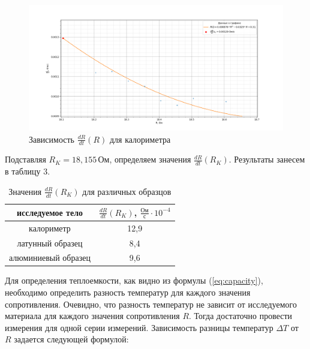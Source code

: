 \documentclass[a4paper, 12pt]{article}%
\begin{document}
\begin{figure}[H]
\begin{center}
\begin{minipage}[h]{0.48\linewidth}
				
			\end{minipage}
			
		\end{center}
		\begin{center}
			\begin{minipage}[h]{0.98\linewidth}
				\includegraphics[width=1\linewidth]{deriv_empty}
				\caption{Зависимость $\frac{dR}{dt}(R)$ для калориметра}
			\end{minipage}
		\end{center}
	\end{figure}
	Подставляя $R_{K} = 18,155 \, \text{Ом}$, определяем значения $\frac{dR}{dt} \left( R_{K} \right)$. Результаты занесем в таблицу 3.
	
	\begin{table}[H]
		\centering
		\begin{tabular}{|c|c|}
			\hline
			исследуемое тело & $\frac{dR}{dt} \left( R_{K} \right)$, $\frac{\text{Ом}}{\text{с}} \cdot 10^{-4}$ \\ \hline
			калориметр          & 12,9 \\ \hline
			латунный образец    & 8,4  \\ \hline
			алюминиевый образец & 9,6  \\ \hline
		\end{tabular}
		\caption{Значения $\frac{dR}{dt} \left( R_{K} \right)$ для различных образцов}
	\end{table}
	
	Для определения теплоемкости, как видно из формулы (\ref{eq:capacity}), необходимо определить разность температур для каждого значения сопротивления. Очевидно, что разность температур не зависит от исследуемого материала для каждого значения сопротивления $R$. Тогда достаточно провести измерения для одной серии измерений. Зависимость разницы температур $\Delta T$ от $R$ задается следующей формулой:
	
\end{document}
